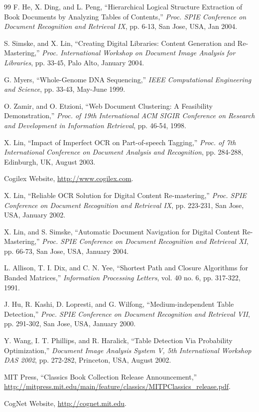 \documentclass[10pt]{article}
\begin{document}
\begin{thebibliography}{99}
 F. He, X. Ding, and L. Peng, ``Hierarchical Logical Structure Extraction of Book Documents by Analyzing Tables of Contents,'' \textit{Proc. SPIE Conference on Document Recognition and Retrieval IX}, pp. 6-13, San Jose, USA, Jan 2004.

 S. Simske, and X. Lin, ``Creating Digital Libraries: Content Generation and Re-Mastering,'' \textit{Proc. International Workshop on Document Image Analysis for Libraries}, pp. 33-45, Palo Alto, January 2004.

 G. Myers, ``Whole-Genome DNA Sequencing,'' \textit{IEEE Computational Engineering and Science}, pp. 33-43, May-June 1999.

 O. Zamir, and O. Etzioni, ``Web Document Clustering: A Feasibility Demonstration,'' \textit{Proc. of 19th International ACM SIGIR Conference on Research and Development in Information Retrieval}, pp. 46-54, 1998.

 X. Lin, ``Impact of Imperfect OCR on Part-of-speech Tagging,'' \textit{Proc. of 7th International Conference on Document Analysis and Recognition}, pp. 284-288, Edinburgh, UK, August 2003.

 Cogilex Website, \url{http://www.cogilex.com}.

 X. Lin, ``Reliable OCR Solution for Digital Content Re-mastering,'' \textit{Proc. SPIE Conference on Document Recognition and Retrieval IX}, pp. 223-231, San Jose, USA, January 2002.

 X. Lin, and S. Simske, ``Automatic Document Navigation for Digital Content Re-Mastering,'' \textit{Proc. SPIE Conference on Document Recognition and Retrieval XI}, pp. 66-73, San Jose, USA, January 2004.

 L. Allison, T. I. Dix, and C. N. Yee, ``Shortest Path and Closure Algorithms for Banded Matrices,'' \textit{Information Processing Letters}, vol. 40 no. 6, pp. 317-322, 1991.

 J. Hu, R. Kashi, D. Lopresti, and G. Wilfong, ``Medium-independent Table Detection,'' \textit{Proc. SPIE Conference on Document Recognition and Retrieval VII}, pp. 291-302, San Jose, USA, January 2000.

 Y. Wang, I. T. Phillips, and R. Haralick, ``Table Detection Via Probability Optimization,'' \textit{Document Image Analysis System V, 5th International Workshop DAS 2002}, pp. 272-282, Princeton, USA, August 2002.

 MIT Press, ``Classics Book Collection Release Announcement,'' \url{http://mitpress.mit.edu/main/feature/classics/MITPClassics_release.pdf}.

 CogNet Website, \url{http://cognet.mit.edu}.

\end{thebibliography}
\end{document}

